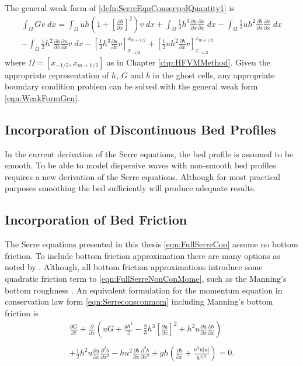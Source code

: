 The general weak form of \eqref{defn:SerreEqnConservedQuantity1} is
\begin{multline}
\int_{\Omega } G v \; dx = \int_{\Omega } uh \left(1 + \left[\frac{\partial b}{\partial x}\right]^2 \right) v \; dx +  \int_{\Omega } \frac{1}{3}h^3  \frac{\partial {u}}{\partial x} \frac{\partial v}{\partial x} \; dx - 
\int_{\Omega }   \frac{1}{2} u h^2\frac{\partial b}{\partial x}  \frac{\partial v }{\partial x}\; dx  \\ - 
\int_{\Omega }   \frac{1}{2}h^2\frac{\partial b}{\partial x}  \frac{\partial u }{\partial x}v \; dx  - \left[\frac{1}{3} h^3  \frac{\partial {u}}{\partial x} v\right]_{x_{-1/2}}^{x_{m+1/2}} + \left[\frac{1}{2} uh^2  \frac{\partial {b}}{\partial x} v\right]_{x_{-1/2}}^{x_{m+1/2}}
\label{eqn:WeakFormGen}
\end{multline}
where $\Omega = \left[x_{-1/2},x_{m+1/2}\right]$ as in Chapter \ref{chp:HFVMMethod}. Given the appropriate representation of $h$, $G$ and $b$ in the ghost cells, any appropriate boundary condition problem can be solved with the general weak form \eqref{eqn:WeakFormGen}.

\subsection{Incorporation of Discontinuous Bed Profiles}
In the current derivation of the Serre equations, the bed profile is assumed to be smooth. To be able to model dispersive waves with non-smooth bed profiles requires a new derivation of the Serre equations. Although for most practical purposes smoothing the bed sufficiently will produce adequate results.

\subsection{Incorporation of Bed Friction}
The Serre equations presented in this thesis \eqref{eqn:FullSerreCon} assume no bottom friction. To include bottom friction approximation there are many options as noted by \citet{DoCarmo-2019-125}. Although, all bottom friction approximations introduce some quadratic friction term to \eqref{eqn:FullSerreNonConMome}, such as the Manning's bottom roughness \cite{Tissier-2011,Filippini-etal-2016-381,DoCarmo-2019-125}. An equivalent formulation for the momentum equation in conservation law form \eqref{eqn:Serreconsconmom} including Manning's bottom friction \cite{ChowVenTe} is 
\begin{equation}
	\begin{split}
		\frac{\partial G}{\partial t}  + \frac{\partial}{\partial x} \left( {u} G + \frac{gh^2}{2} -  \frac{2}{3}h^3 \left[\frac{\partial {u}}{\partial x}\right]^2 + h^2 {u}\frac{\partial {u}}{\partial x}\frac{\partial b}{\partial x} \right) \\ \\ +   \frac{1}{2}h^2 {u} \frac{\partial {u}}{\partial x} \frac{\partial^2 b}{\partial x^2}  - h {u}^2\frac{\partial b}{\partial x}\frac{\partial^2 b}{\partial x^2}  + gh \left(\frac{\partial b}{\partial x} + \frac{n^2 u \left|u\right|}{h^{4/3}} \right)   = 0.
	\end{split}
\end{equation}

